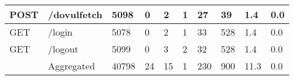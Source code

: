 \begin{table*}[h]
\begin{tabular}{|l|l|l|l|l|l|l|l|l|l|}
    POST                                  & /dovulfetch                        & 5098                                      & 0                                      & 2                                          & 1                                      & 27                                     & 39                                                 & 1.4                               & 0.0                                      \\ \hline
    GET                                   & /login                             & 5078                                      & 0                                      & 2                                          & 1                                      & 33                                     & 528                                                & 1.4                               & 0.0                                      \\ \hline
    GET                                   & /logout                            & 5099                                      & 0                                      & 3                                          & 2                                      & 32                                     & 528                                                & 1.4                               & 0.0                                      \\ \hline
                                          & Aggregated                         & 40798                                     & 24                                     & 15                                         & 1                                      & 230                                    & 900                                                & 11.3                              & 0.0                                      \\ \hline
    \end{tabular}
  \end{table*}